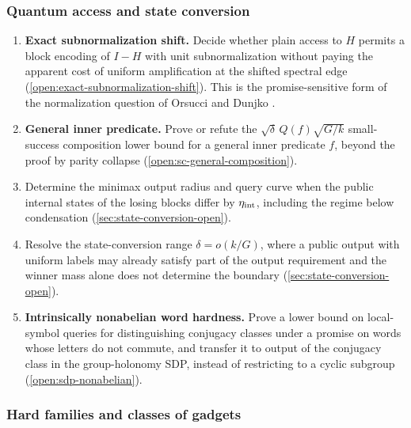 \subsubsection{Quantum access and state conversion}

\begin{enumerate}[leftmargin=*,label=A\arabic*.]
 \item \textbf{Exact subnormalization shift.}  Decide whether plain access to
 \(H\) permits a block encoding of \(I-H\) with unit subnormalization without
 paying the apparent cost of uniform amplification at the shifted spectral
 edge (\cref{open:exact-subnormalization-shift}).  This is the
 promise-sensitive form of the normalization question of Orsucci and Dunjko
 \cite{orsucci2021-on-solving-classes-of-positive}.
 \item \textbf{General inner predicate.}  Prove or refute the
 \(\sqrt\delta\,Q(f)\sqrt{G/k}\) small-success composition lower bound for a
 general inner predicate \(f\), beyond the proof by parity collapse
 (\cref{open:sc-general-composition}).
 \item Determine the minimax output radius and query curve when the public
 internal states of the losing blocks differ by \(\eta_{\rm int}\), including
 the regime below condensation (\cref{sec:state-conversion-open}).
 \item Resolve the state-conversion range \(\delta=o(k/G)\), where a public
 output with uniform labels may already satisfy part of the output requirement
 and the winner mass alone does not determine the boundary
 (\cref{sec:state-conversion-open}).
 \item \textbf{Intrinsically nonabelian word hardness.}  Prove a lower bound
 on local-symbol queries for distinguishing conjugacy classes under a
 promise on words whose letters do not commute, and transfer it to output of
 the conjugacy class in the group-holonomy SDP, instead of restricting to a
 cyclic subgroup
 (\cref{open:sdp-nonabelian}).
\end{enumerate}

\subsubsection{Hard families and classes of gadgets}

